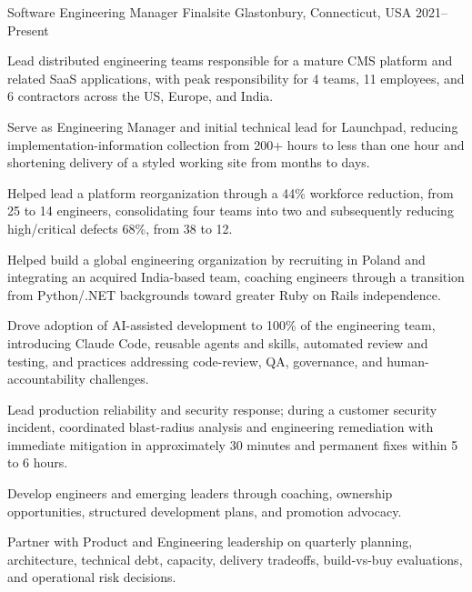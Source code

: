 \documentclass[12pt, letterpaper]{awesome-cv}
\begin{document}
\begin{cventries}
  \cventry
    {Software Engineering Manager}
    {Finalsite}
    {Glastonbury, Connecticut, USA}
    {2021--Present}
    {
      \begin{cvitems}
        \item {Lead distributed engineering teams responsible for a mature CMS platform and related SaaS applications, with peak responsibility for 4 teams, 11 employees, and 6 contractors across the US, Europe, and India.}
        \item {Serve as Engineering Manager and initial technical lead for Launchpad, reducing implementation-information collection from 200+ hours to less than one hour and shortening delivery of a styled working site from months to days.}
        \item {Helped lead a platform reorganization through a 44\% workforce reduction, from 25 to 14 engineers, consolidating four teams into two and subsequently reducing high/critical defects 68\%, from 38 to 12.}
        \item {Helped build a global engineering organization by recruiting in Poland and integrating an acquired India-based team, coaching engineers through a transition from Python/.NET backgrounds toward greater Ruby on Rails independence.}
        \item {Drove adoption of AI-assisted development to 100\% of the engineering team, introducing Claude Code, reusable agents and skills, automated review and testing, and practices addressing code-review, QA, governance, and human-accountability challenges.}
        \item {Lead production reliability and security response; during a customer security incident, coordinated blast-radius analysis and engineering remediation with immediate mitigation in approximately 30 minutes and permanent fixes within 5 to 6 hours.}
        \item {Develop engineers and emerging leaders through coaching, ownership opportunities, structured development plans, and promotion advocacy.}
        \item {Partner with Product and Engineering leadership on quarterly planning, architecture, technical debt, capacity, delivery tradeoffs, build-vs-buy evaluations, and operational risk decisions.}
      \end{cvitems}
    }


\end{cventries}
\end{document}
